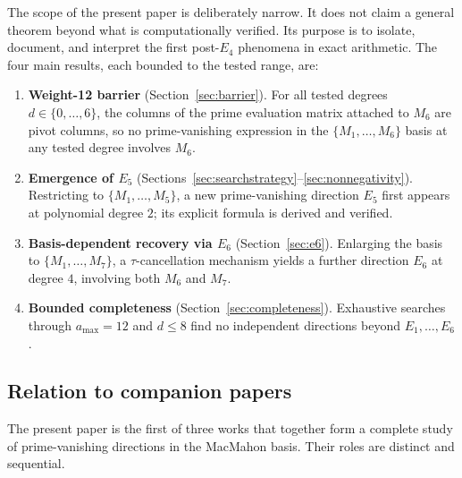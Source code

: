 \documentclass[11pt]{article}
\begin{document}
The scope of the present paper is deliberately narrow.
It does not claim a general theorem beyond what is computationally verified.
Its purpose is to isolate, document, and interpret the first post-$E_4$ phenomena in
exact arithmetic.
The four main results, each bounded to the tested range, are:
\begin{enumerate}[leftmargin=*,label=\textbf{(\arabic*)}]
\item \textbf{Weight-12 barrier} (Section~\ref{sec:barrier}).
For all tested degrees $d\in\{0,\dots,6\}$, the columns of the prime evaluation matrix
attached to $M_6$ are pivot columns, so no prime-vanishing expression in the
$\{M_1,\dots,M_6\}$ basis at any tested degree involves $M_6$.
\item \textbf{Emergence of $E_5$} (Sections~\ref{sec:searchstrategy}--\ref{sec:nonnegativity}).
Restricting to $\{M_1,\dots,M_5\}$, a new prime-vanishing direction $E_5$ first appears
at polynomial degree $2$; its explicit formula is derived and verified.
\item \textbf{Basis-dependent recovery via $E_6$} (Section~\ref{sec:e6}).
Enlarging the basis to $\{M_1,\dots,M_7\}$, a $\tau$-cancellation mechanism yields a
further direction $E_6$ at degree $4$, involving both $M_6$ and $M_7$.
\item \textbf{Bounded completeness} (Section~\ref{sec:completeness}).
Exhaustive searches through $a_{\max}=12$ and $d\le 8$ find no independent directions
beyond $E_1,\dots,E_6$.
\end{enumerate}

\subsection*{Relation to companion papers}

The present paper is the first of three works that together form a complete study of
prime-vanishing directions in the MacMahon basis.
Their roles are distinct and sequential.
\end{document}
